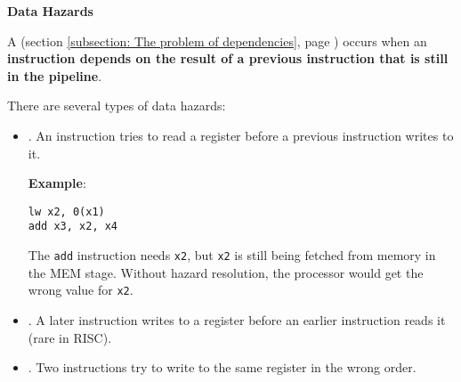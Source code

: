 \highspace
\begin{flushleft}
    \textcolor{Red2}{ \textbf{Data Hazards}}
\end{flushleft}
A  (section \ref{subsection: The problem of dependencies}, page \pageref{subsection: The problem of dependencies}) occurs when an \textbf{instruction depends on the result of a previous instruction that is still in the pipeline}.

\highspace
There are several types of data hazards:
\begin{itemize}\label{def: Read After Write - RAW}
    \item {}. An instruction tries to read a register before a previous instruction writes to it.

    \textcolor{Green3}{ \textbf{Example}}:
    \begin{lstlisting}[language=riscv]
lw x2, 0(x1)
add x3, x2, x4\end{lstlisting}
    The \texttt{add} instruction needs \texttt{x2}, but \texttt{x2} is still being fetched from memory in the MEM stage. Without hazard resolution, the processor would get the wrong value for \texttt{x2}.

    \item {}. A later instruction writes to a register before an earlier instruction reads it (rare in RISC).

    \item {}. Two instructions try to write to the same register in the wrong order.
\end{itemize}